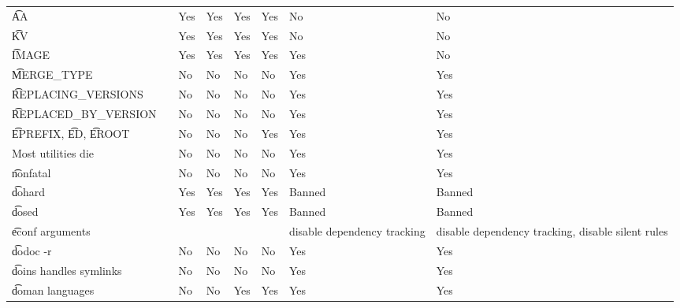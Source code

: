 \begin{landscape}
\begin{longtable}{llP{5em}P{5em}P{6em}P{6em}P{6em}P{6em}}
\t{AA} &  &
    Yes & Yes & Yes & Yes & No & No \\

\t{KV} &  &
    Yes & Yes & Yes & Yes & No & No \\

\t{IMAGE} &  &
    Yes & Yes & Yes & Yes & Yes & No \\

\t{MERGE\_TYPE} &  &
    No & No & No & No & Yes & Yes \\

\t{REPLACING\_VERSIONS} &  &
    No & No & No & No & Yes & Yes \\

\t{REPLACED\_BY\_VERSION} &  &
    No & No & No & No & Yes & Yes \\

\t{EPREFIX}, \t{ED}, \t{EROOT} &  &
    No & No & No & Yes & Yes & Yes \\

Most utilities die &  &
    No & No & No & No & Yes & Yes \\

\t{nonfatal} &  &
    No & No & No & No & Yes & Yes \\

\t{dohard} &  &
    Yes & Yes & Yes & Yes & Banned & Banned \\

\t{dosed} &  &
    Yes & Yes & Yes & Yes & Banned & Banned \\

\t{econf} arguments &  &
    &  &  &  & disable dependency tracking & disable dependency tracking, disable silent rules \\

\t{dodoc -r} &  &
    No & No & No & No & Yes & Yes \\

\t{doins} handles symlinks &  &
    No & No & No & No & Yes & Yes \\

\t{doman} languages &  &
    No & No & Yes & Yes & Yes & Yes \\


\end{longtable}
\end{landscape}
